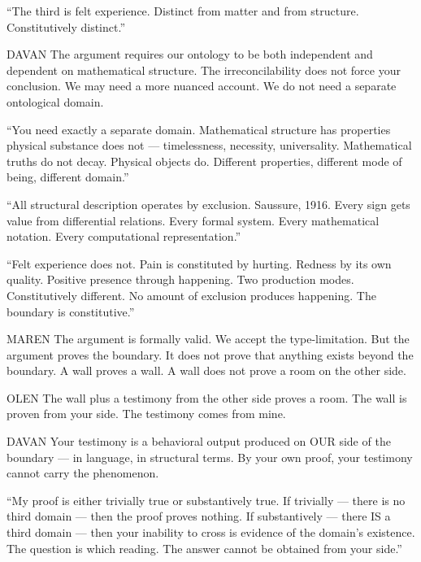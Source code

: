 \enquote{The third is felt experience. Distinct from matter and from structure. Constitutively distinct.}

\begin{tribunal}{DAVAN}
The argument requires our ontology to be both independent and dependent on mathematical structure. The irreconcilability does not force your conclusion. We may need a more nuanced account. We do not need a separate ontological domain.
\end{tribunal}

\enquote{You need exactly a separate domain. Mathematical structure has properties physical substance does not — timelessness, necessity, universality. Mathematical truths do not decay. Physical objects do. Different properties, different mode of being, different domain.}

\enquote{All structural description operates by exclusion. Saussure, 1916. Every sign gets value from differential relations. Every formal system. Every mathematical notation. Every computational representation.}

\enquote{Felt experience does not. Pain is constituted by hurting. Redness by its own quality. Positive presence through happening. Two production modes. Constitutively different. No amount of exclusion produces happening. The boundary is constitutive.}

\begin{tribunal}{MAREN}
The argument is formally valid. We accept the type-limitation. But the argument proves the boundary. It does not prove that anything exists beyond the boundary. A wall proves a wall. A wall does not prove a room on the other side.
\end{tribunal}

\begin{tribunal}{OLEN}
The wall plus a testimony from the other side proves a room. The wall is proven from your side. The testimony comes from mine.
\end{tribunal}

\begin{tribunal}{DAVAN}
Your testimony is a behavioral output produced on OUR side of the boundary — in language, in structural terms. By your own proof, your testimony cannot carry the phenomenon.
\end{tribunal}

\enquote{My proof is either trivially true or substantively true. If trivially — there is no third domain — then the proof proves nothing. If substantively — there IS a third domain — then your inability to cross is evidence of the domain's existence. The question is which reading. The answer cannot be obtained from your side.}

